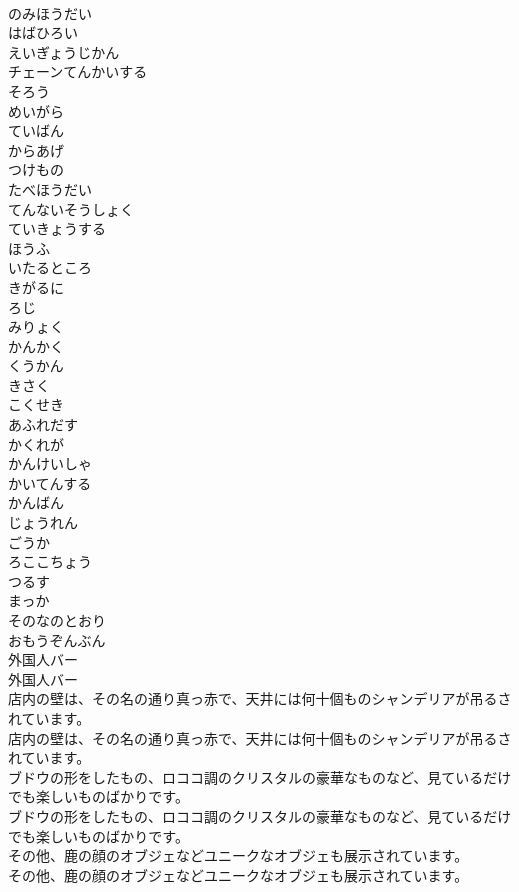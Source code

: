 \documentclass[8pt]{extreport}
\begin{document}
\begin{CJK}{UTF8}{min}
\\	のみほうだい
\\	はばひろい
\\	えいぎょうじかん
\\	チェーンてんかいする
\\	そろう
\\	めいがら
\\	ていばん
\\	からあげ
\\	つけもの
\\	たべほうだい
\\	てんないそうしょく
\\	ていきょうする
\\	ほうふ
\\	いたるところ
\\	きがるに
\\	ろじ
\\	みりょく
\\	かんかく
\\	くうかん
\\	きさく
\\	こくせき
\\	あふれだす
\\	かくれが
\\	かんけいしゃ
\\	かいてんする
\\	かんばん
\\	じょうれん
\\	ごうか
\\	ろここちょう
\\	つるす
\\	まっか
\\	そのなのとおり
\\	おもうぞんぶん
\\	外国人バー
\\	外国人バー
\\	店内の壁は、その名の通り真っ赤で、天井には何十個ものシャンデリアが吊るされています。
\\	店内の壁は、その名の通り真っ赤で、天井には何十個ものシャンデリアが吊るされています。
\\	ブドウの形をしたもの、ロココ調のクリスタルの豪華なものなど、見ているだけでも楽しいものばかりです。
\\	ブドウの形をしたもの、ロココ調のクリスタルの豪華なものなど、見ているだけでも楽しいものばかりです。
\\	その他、鹿の顔のオブジェなどユニークなオブジェも展示されています。
\\	その他、鹿の顔のオブジェなどユニークなオブジェも展示されています。

\end{CJK}
\end{document}
